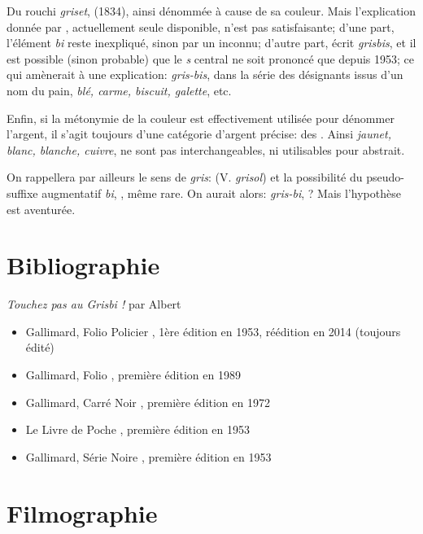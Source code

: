 Du rouchi \emph{griset},  (1834), ainsi dénommée à cause de sa couleur. Mais l'explication donnée par , actuellement seule disponible, n'est pas satisfaisante; d'une part, l'élément \emph{bi} reste inexpliqué, sinon par un  inconnu; d'autre part,  écrit \emph{grisbis}, et il est possible (sinon probable) que le \emph{s} central ne soit prononcé que depuis 1953; ce qui amènerait à une explication: \emph{gris-bis}, dans la série des désignants issus d'un nom du pain, \emph{blé, carme, biscuit, galette}, etc.

Enfin, si la métonymie de la couleur est effectivement utilisée pour dénommer l'argent, il s'agit toujours d'une catégorie d'argent précise: des . Ainsi \emph{jaunet, blanc, blanche, cuivre}, ne sont pas interchangeables, ni utilisables pour  abstrait.

On rappellera par ailleurs le sens de \emph{gris}:  (V. \emph{grisol}) et la possibilité du pseudo-suffixe augmentatif \emph{bi}, , même rare. On aurait alors: \emph{gris-bi},  ? Mais l'hypothèse est aventurée.


\section{Bibliographie\label{preamble-biblio}}


\emph{Touchez pas au Grisbi !} par Albert 

\begin{itemize}
	\item Gallimard, Folio Policier , 1ère édition en 1953, réédition en 2014 (toujours édité)
	\item Gallimard, Folio , première édition en 1989
	\item Gallimard, Carré Noir , première édition en 1972
	\item Le Livre de Poche , première édition en 1953
	\item Gallimard, Série Noire , première édition en 1953
\end{itemize}


\section{Filmographie\label{preamble-filmography}}



